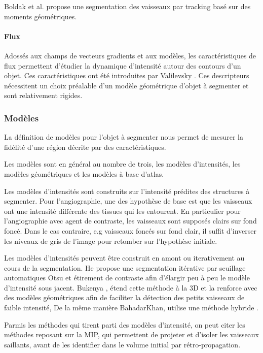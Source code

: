 Boldak et al. \cite{boldak2003_moments} propose une segmentation des vaisseaux par tracking basé sur des moments géométriques.

\paragraph{Flux}

Adossés aux champs de vecteurs gradients et aux modèles, les caractéristiques de flux permettent d'étudier la dynamique d'intensité autour des contours d'un objet. Ces caractéristiques ont été introduites par Valilevsky \cite{Vasilevskiy2002_flux}. Ces descripteurs nécessitent un choix préalable d'un modèle géométrique d'objet à segmenter et sont relativement rigides.

\subsubsection{Modèles}

La définition de modèles pour l'objet à segmenter nous permet de mesurer la fidélité d'une région décrite par des caractéristiques.

Les modèles sont en général au nombre de trois, les modèles d'intensités, les modèles géométriques et les modèles à base d'atlas.

Les modèles d'intensités sont construits sur l'intensité prédites des structures à segmenter. Pour l'angiographie, une des hypothèse de base est que les vaisseaux ont une intensité différente des tissues qui les entourent. En particulier pour l'angiographie avec agent de contraste, les vaisseaux sont supposés clairs sur fond foncé. Dans le cas contraire, e.g vaisseaux foncés sur fond clair, il suffit d'inverser les niveaux de gris de l'image pour retomber sur l'hypothèse initiale.

Les modèles d'intensités peuvent être construit en amont ou iterativement au cours de la segmentation. He \cite{He2013_multi_otsu} propose une segmentation itérative par seuillage automatiques Otsu et étirement de contraste afin d'élargir peu à peu le modèle d'intensité sous jacent. Bukenya \cite{bukenya2016_heart_otsu_top_hat_hessian}, étend cette méthode à la 3D et la renforce avec des modèles géométriques afin de faciliter la détection des petits vaisseaux de faible intensité, De la même manière BahadarKhan, utilise une méthode hybride \cite{Bahadarkhan2016_fundus_region_based_otsu}.

Parmis les méthodes qui tirent parti des modèles d'intensité, on peut citer les méthodes reposant sur la MIP, qui permettent de projeter et d'isoler les vaisseaux saillants, avant de les identifier dans le volume initial par rétro-propagation.

